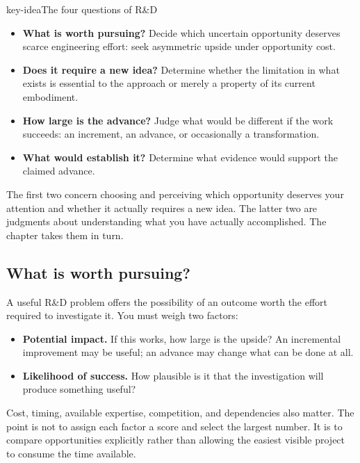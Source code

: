 \begin{bookbox}{key-idea}{The four questions of R\&D} %
\begin{itemize}
\tightlist
\item
  \textbf{What is worth pursuing?} Decide which uncertain opportunity deserves scarce engineering
  effort: seek asymmetric upside under opportunity cost.
\item
  \textbf{Does it require a new idea?} Determine whether the limitation in what exists is essential to
  the approach or merely a property of its current embodiment.
\item
  \textbf{How large is the advance?} Judge what would be different if the work succeeds: an increment,
  an advance, or occasionally a transformation.
\item
  \textbf{What would establish it?} Determine what evidence would support the claimed advance.
\end{itemize}
\end{bookbox}

The first two concern choosing and perceiving which opportunity deserves your attention and
whether it actually requires a new idea. The latter two are judgments about understanding
what you have actually accomplished. The chapter takes them in turn.

\subsection{What is worth pursuing?}\label{sec-worth-pursuing}

A useful R\&D problem offers the possibility of an outcome worth the effort required to investigate
it. You must weigh two factors:

\begin{itemize}
\tightlist
\item
  \textbf{Potential impact.} If this works, how large is the upside? An incremental improvement may be
  useful; an advance may change what can be done at all.
\item
  \textbf{Likelihood of success.} How plausible is it that the investigation will produce something
  useful?
\end{itemize}

Cost, timing, available expertise, competition, and dependencies also matter. The point is not to
assign each factor a score and select the largest number. It is to compare opportunities explicitly
rather than allowing the easiest visible project to consume the time available.

